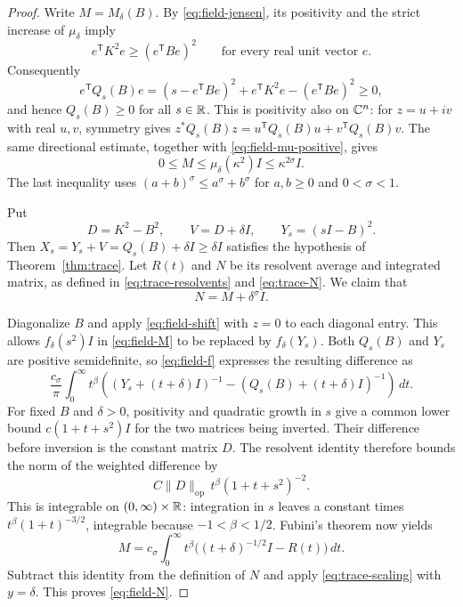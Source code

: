 \begin{proof}
Write $M=M_\delta(B)$.  By \eqref{eq:field-jensen}, its positivity
and the strict increase of $\mu_\delta$ imply
\[
 e^{\mathsf T}K^2e\geq(e^{\mathsf T}Be)^2
                 \qquad\text{for every real unit vector }e.
\]
Consequently
\[
 e^{\mathsf T}Q_s(B)e
  =(s-e^{\mathsf T}Be)^2
       +e^{\mathsf T}K^2e-(e^{\mathsf T}Be)^2\geq0,
\]
and hence $Q_s(B)\geq0$ for all $s\in\mathbb R$.  This is positivity
also on $\mathbb C^n$: for $z=u+iv$ with real $u,v$, symmetry gives
$z^*Q_s(B)z=u^{\mathsf T}Q_s(B)u+v^{\mathsf T}Q_s(B)v$.
The same directional estimate, together with
\eqref{eq:field-mu-positive}, gives
\begin{equation}\label{eq:field-M-bound}
 0\leq M\leq\mu_\delta(\kappa^2)I
          \leq\kappa^{2\sigma}I.
\end{equation}
The last inequality uses $(a+b)^\sigma\leq a^\sigma+b^\sigma$
for $a,b\geq0$ and $0<\sigma<1$.

Put
\[
 D=K^2-B^2,\qquad V=D+\delta I,\qquad Y_s=(sI-B)^2.
\]
Then $X_s=Y_s+V=Q_s(B)+\delta I\geq\delta I$ satisfies the
hypothesis of Theorem~\ref{thm:trace}.  Let $R(t)$ and $N$ be its
resolvent average and integrated matrix, as defined in
\eqref{eq:trace-resolvents} and \eqref{eq:trace-N}.  We claim that
\begin{equation}\label{eq:field-N}
 N=M+\delta^\sigma I.
\end{equation}

Diagonalize $B$ and apply \eqref{eq:field-shift} with $z=0$ to
each diagonal entry.  This allows $f_\delta(s^2)I$ in
\eqref{eq:field-M} to be replaced by $f_\delta(Y_s)$.
Both $Q_s(B)$ and $Y_s$ are positive semidefinite, so
\eqref{eq:field-f} expresses the resulting difference as
\[
 \frac{c_\sigma}{\pi}\int_0^\infty t^\beta
  \left((Y_s+(t+\delta)I)^{-1}
       -(Q_s(B)+(t+\delta)I)^{-1}\right)\,dt.
\]
For fixed $B$ and $\delta>0$, positivity and quadratic growth in
$s$ give a common lower bound $c(1+t+s^2)I$ for the two matrices
being inverted.  Their difference before inversion is the constant
matrix $D$.  The resolvent identity therefore bounds the norm of
the weighted difference by
\[
 C\|D\|_{\mathrm{op}}\,t^\beta(1+t+s^2)^{-2}.
\]
This is integrable on $(0,\infty)\times\mathbb R$: integration in $s$
leaves a constant times $t^\beta(1+t)^{-3/2}$, integrable because
$-1<\beta<1/2$.  Fubini's theorem now yields
\[
 M=c_\sigma\int_0^\infty t^\beta
          \bigl((t+\delta)^{-1/2}I-R(t)\bigr)\,dt.
\]
Subtract this identity from the definition of $N$ and apply
\eqref{eq:trace-scaling} with $y=\delta$.  This proves
\eqref{eq:field-N}.


\end{proof}
